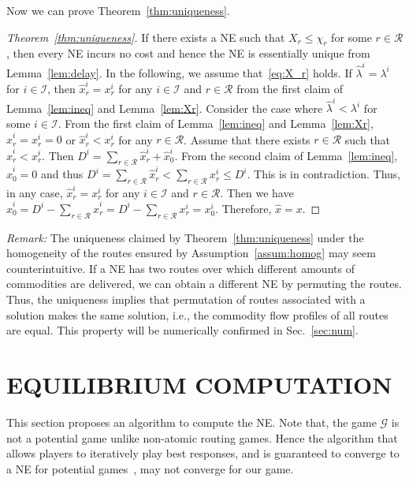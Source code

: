 \documentclass[letterpaper, 10 pt, conference]{ieeeconf}  %
\newcommand{\mc}[1]{\mathcal{#1}}
\begin{document}
Now we can prove Theorem~\ref{thm:uniqueness}.

\begin{proof}[Theorem~\ref{thm:uniqueness}]
If there exists a NE such that $X_r\leq \chi_r$ for some $r\in\mc{R}$, then every NE incurs no cost and hence the NE is essentially unique from Lemma~\ref{lem:delay}.
In the following, we assume that~\eqref{eq:X_r} holds.
If $\hat{\lambda}^i=\lambda^i$ for $i \in \mc{I}$, then $\hat{x}^i_r = x^i_r$ for any $i \in \mc{I}$ and $r\in\mc{R}$ from the first claim of Lemma~\ref{lem:ineq} and Lemma~\ref{lem:Xr}.
Consider the case where $\hat{\lambda}^i<\lambda^i$ for some $i \in \mc{I}$.
From the first claim of Lemma~\ref{lem:ineq} and Lemma~\ref{lem:Xr}, $\hat{x}^i_r=x^i_r=0$ or $\hat{x}^i_r<x^i_r$ for any $r\in\mc{R}$.
Assume that there exists $r\in\mc{R}$ such that $\hat{x}^i_r<x^i_r$.
Then $D^i=\sum_{r\in\mc{R}}\hat{x}^i_r+\hat{x}^i_0$.
From the second claim of Lemma~\ref{lem:ineq}, $\hat{x}^i_0=0$ and thus $D^i=\sum_{r\in\mc{R}}\hat{x}^i_r<\sum_{r\in\mc{R}}x^i_r\leq D^i$.
This is in contradiction.
Thus, in any case, $\hat{x}^i_r = x^i_r$ for any $i \in \mc{I}$ and $r\in\mc{R}$.
Then we have $\hat{x}^i_0=D^i-\sum_{r\in\mc{R}}\hat{x}^i_r=D^i-\sum_{r\in\mc{R}}x^i_r=x^i_0$.
Therefore, $\hat{x}=x$.
\end{proof}

\emph{Remark:}
The uniqueness claimed by Theorem~\ref{thm:uniqueness} under the homogeneity of the routes ensured by Assumption~\ref{assum:homog} may seem counterintuitive.
If a NE has two routes over which different amounts of commodities are delivered, we can obtain a different NE by permuting the routes.
Thus, the uniqueness implies that permutation of routes associated with a solution makes the same solution, i.e., the commodity flow profiles of all routes are equal.
This property will be numerically confirmed in Sec.~\ref{sec:num}.
\fi

\section{EQUILIBRIUM COMPUTATION}
\label{sec:alg}

This section proposes an algorithm to compute the NE.
Note that, the game $\mc{G}$ is not a potential game unlike non-atomic routing games.
Hence the algorithm that allows players to iteratively play best responses, and is guaranteed to converge to a NE for potential games~\cite[Theorem 6.4.3]{shoham2008multiagent}, may not converge for our game.
\end{document}

